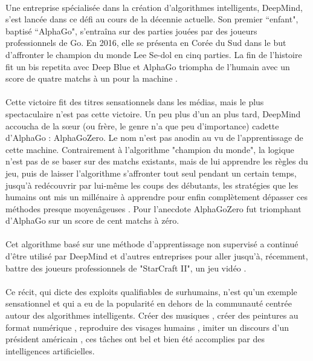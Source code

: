\documentclass[10pt, french, a4paper]{report}
\begin{document}
\paragraph{}
Une entreprise spécialisée dans la création d’algorithmes intelligents, DeepMind, s’est lancée dans ce défi au cours de la décennie actuelle. Son premier ``enfant", baptisé ``AlphaGo", s’entraîna sur des parties jouées par des joueurs professionnels de Go. En 2016, elle se présenta en Corée du Sud dans le but d’affronter le champion du monde Lee Se-dol en cinq parties. La fin de l’histoire fit un bis repetita avec Deep Blue et AlphaGo triompha de l’humain avec un score de quatre matchs à un pour la machine \citep{deepmind_alphago_2016}.

\paragraph{}
Cette victoire fit des titres sensationnels dans les médias, mais le plus spectaculaire n’est pas cette victoire. Un peu plus d’un an plus tard, DeepMind accoucha de la sœur (ou frère, le genre n’a que peu d’importance) cadette d’AlphaGo : AlphaGoZero. Le nom n’est pas anodin au vu de l’apprentissage de cette machine. Contrairement à l’algorithme "champion du monde", la logique n’est pas de se baser sur des matchs existants, mais de lui apprendre les règles du jeu, puis de laisser l’algorithme s’affronter tout seul pendant un certain temps, jusqu’à redécouvrir par lui-même les coups des débutants, les stratégies que les humains ont mis un millénaire à apprendre pour enfin complètement dépasser ces méthodes presque moyenâgeuses \citep{silver_mastering_2017}. Pour l’anecdote AlphaGoZero fut triomphant d’AlphaGo sur un score de cent matchs à zéro.

\paragraph{}
Cet algorithme basé sur une méthode d’apprentissage non supervisé a continué d’être utilisé par DeepMind et d’autres entreprises pour aller jusqu’à, récemment, battre des joueurs professionnels de "StarCraft II", un jeu vidéo \citep{vinyals_alphastar:_2019}.

\paragraph{}
Ce récit, qui dicte des exploits qualifiables de surhumains, n’est qu’un exemple sensationnel et qui a eu de la popularité en dehors de la communauté centrée autour des algorithmes intelligents. Créer des musiques \citep{medeot_structurenet:_2018}, créer des peintures au format numérique \citep{mordvintsev_inceptionism:_2015}, reproduire des visages humains \citep{karras_style-based_2018}, imiter un discours d’un président américain \citep{suwajanakorn_synthesizing_2017}, ces tâches ont bel et bien été accomplies par des intelligences artificielles.
\end{document}
